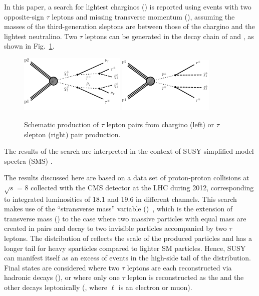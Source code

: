 In this paper, a search for lightest charginos (\chione) is reported using events 
with two opposite-sign $\tau$ leptons and 
missing transverse momentum (\MPT), assuming the masses of the third-generation sleptons are between those of the 
chargino and the lightest neutralino. 
Two $\tau$ leptons can be generated in the decay chain of \chione and \sTau, as shown in Fig.~\ref{fig:Productions}. 
\begin{figure}[!htb]
\centering
\includegraphics[width=0.45\textwidth]{Introductionfigs/TChipmSlepSnu.pdf}
\includegraphics[width=0.41\textwidth]{Introductionfigs/TSlepSlep.pdf}

\caption{Schematic production of $\tau$ lepton pairs from chargino (left) or $\tau$ slepton (right) pair production.}
\label{fig:Productions}
\end{figure}
The results of the search are interpreted in the context of SUSY simplified model spectra (SMS) \cite{Alwall:2008ag,alves:sms}.

The results discussed here are based on a data set of proton-proton 
collisions at $\sqrt{s}$ = 8\TeV
collected with the CMS detector at the LHC during 2012, corresponding to integrated
luminosities of 18.1 and 19.6 \invfb in different channels. 
This search makes use of the ``stransverse mass'' variable (\mttwo)~\cite{Lester:1999tx,Barr:2003rg},
which is the extension of transverse mass (\mt) to the case 
where two massive particles with equal mass are created in pairs  
and decay to two invisible particles accompanied by two $\tau$ leptons.  
The distribution of \mttwo reflects the scale of the produced particles and has a longer tail for heavy sparticles
compared to lighter SM particles. Hence, SUSY 
can manifest itself
as an excess of events in the high-side tail of the \mttwo distribution. 
Final states are considered where
two $\tau$ leptons are each reconstructed via hadronic decays (\tauTau), or where only one $\tau$ lepton is reconstructed as the \Tau and the other decays leptonically (\leptonTau, where $\ell$ is an electron or muon). 

